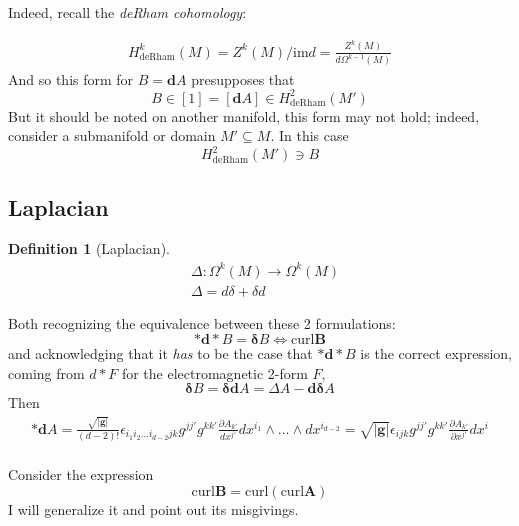 \documentclass[10pt]{amsart}
\newtheorem{definition}{Definition}
\begin{document}
\begin{multicols*}{2}
Indeed, recall the \emph{deRham cohomology}:

\[
\begin{gathered}
	H^k_{\text{deRham}}(M) = Z^k(M)/ \text{im}d = \frac{Z^k(M)}{ d\Omega^{k-1}(M) }
\end{gathered}
\]
And so this form for $B=\mathbf{d}A$ presupposes that 
\[
B \in [1] = [\mathbf{d}A ] \in H^2_{\text{deRham}}(M')
\]
But it should be noted on another manifold, this form may not hold; indeed, consider a submanifold or domain $M' \subseteq M$.  In this case
\[
H^2_{\text{deRham}}(M') \ni B
\]

\subsection{Laplacian}

\begin{definition}[Laplacian]
\begin{equation}
\begin{aligned}
	& \Delta : \Omega^k(M) \to \Omega^k(M) \\ 
	& \Delta = d\delta + \delta d
\end{aligned}
\end{equation}
\end{definition}

Both recognizing the equivalence between these 2 formulations:
\[
\mathbf{*d*}B = \mathbf{\delta}B \Longleftrightarrow \text{curl} \mathbf{B}
\]
and acknowledging that it \emph{has} to be the case that $\mathbf{*d*}B$ is the correct expression, coming from $d*F$ for the electromagnetic 2-form $F$, 
\[
\mathbf{\delta} B = \mathbf{\delta} \mathbf{d}A = \Delta A - \mathbf{d \delta} A
\]
Then
\[
\begin{gathered}
	\mathbf{*d}A = \frac{ \sqrt{|\mathbf{g} |} }{ (d-2)! } \epsilon_{i_1i_2 \dots i_{d-2} jk} g^{jj'} g^{kk'} \frac{ \partial A_{k'}}{ dx^{j'} } dx^{i_1} \wedge \dots \wedge dx^{i_{d-2}} = \sqrt{ |\mathbf{g} | } \epsilon_{ijk} g^{jj'} g^{kk'} \frac{ \partial A_{k'} }{ \partial x^{j'} } dx^i  \\
\end{gathered}
\]


Consider the expression 
\[
\text{curl}\mathbf{B} = \text{curl}( \text{curl} \mathbf{A})
\]
I will generalize it and point out its misgivings.  


\end{multicols*}
\end{document}
